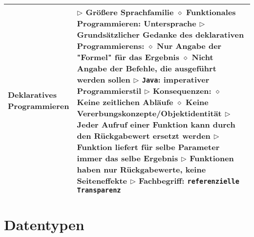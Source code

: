 \begin{tabular}{ | p{} p{} | }
  \makecell[l]{Deklaratives \\ Programmieren} & \makecell[l]{
  $\triangleright$ Grö\ss ere Sprachfamilie \\
  \hspace{0.4cm} $\diamond$ Funktionales Programmieren: Untersprache \\
  $\triangleright$ Grundsätzlicher Gedanke des deklarativen Programmierens: \\
  \hspace{0.4cm} $\diamond$ Nur Angabe der "Formel" für das Ergebnis \\
  \hspace{0.4cm} $\diamond$ Nicht Angabe der Befehle, die ausgeführt werden sollen \\
  $\triangleright$ \texttt{Java}: imperativer Programmierstil \\
  $\triangleright$ Konsequenzen: \\
  \hspace{0.4cm} $\diamond$ Keine zeitlichen Abläufe \\
  \hspace{0.4cm} $\diamond$ Keine Vererbungskonzepte/Objektidentität \\
  $\triangleright$ Jeder Aufruf einer Funktion kann durch den Rückgabewert ersetzt werden \\
  $\triangleright$ Funktion liefert für selbe Parameter \textbf{immer} das selbe Ergebnis \\
  $\triangleright$ Funktionen haben nur Rückgabewerte, keine Seiteneffekte \\
  $\triangleright$ Fachbegriff: \texttt{referenzielle Transparenz} } \\ \hline

  \end{tabular}




\section{Datentypen} 

